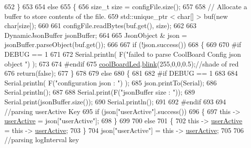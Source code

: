 \begin{DoxyCode}
652     \}
653 
654     \textcolor{keywordflow}{else}
655     \{
656         \textcolor{keywordtype}{size\_t} size = configFile.size();
657 
658         \textcolor{comment}{// Allocate a buffer to store contents of the file.}
659         std::unique\_ptr < char[] > buf(\textcolor{keyword}{new} \textcolor{keywordtype}{char}[size]);
660 
661         configFile.readBytes(buf.get(), size);
662 
663         DynamicJsonBuffer jsonBuffer;
664 
665         JsonObject & json = jsonBuffer.parseObject(buf.get());
666 
667         \textcolor{keywordflow}{if} (!json.success())
668         \{
669         
670 \textcolor{preprocessor}{        #if DEBUG == 1}
671 
672             Serial.println( F(\textcolor{stringliteral}{"failed to parse CoolBoard Config json object "}) );
673     
674 \textcolor{preprocessor}{        #endif}
675             \hyperlink{classCoolBoard_a1b1d3c684a5baa56b08486e192fd8e97}{coolBoardLed}.\hyperlink{classCoolBoardLed_a96e1ea13003eee34c9dbcef340404426}{blink}(255,0,0,0.5);\textcolor{comment}{//shade of red     }
676             \textcolor{keywordflow}{return}(\textcolor{keyword}{false});
677         \}
678 
679         \textcolor{keywordflow}{else}
680         \{   
681         
682 \textcolor{preprocessor}{        #if DEBUG == 1}
683             
684             Serial.println( F(\textcolor{stringliteral}{"configuration json : "}) );
685             json.printTo(Serial);
686             Serial.println();
687             
688             Serial.print(F(\textcolor{stringliteral}{"jsonBuffer size : "}));
689             Serial.print(jsonBuffer.size());
690             Serial.println();
691 
692 \textcolor{preprocessor}{        #endif}
693             
694             \textcolor{comment}{//parsing userActive Key}
695             \textcolor{keywordflow}{if} (json[\textcolor{stringliteral}{"userActive"}].success())
696             \{
697                 \textcolor{keyword}{this} -> \hyperlink{classCoolBoard_a6395459131d6889a3005f79c7a35e964}{userActive} = json[\textcolor{stringliteral}{"userActive"}];
698             \}
699 
700             \textcolor{keywordflow}{else}
701             \{
702                 \textcolor{keyword}{this} -> \hyperlink{classCoolBoard_a6395459131d6889a3005f79c7a35e964}{userActive} = \textcolor{keyword}{this} -> \hyperlink{classCoolBoard_a6395459131d6889a3005f79c7a35e964}{userActive};
703             \}
704             json[\textcolor{stringliteral}{"userActive"}] = \textcolor{keyword}{this} -> \hyperlink{classCoolBoard_a6395459131d6889a3005f79c7a35e964}{userActive};
705 
706             \textcolor{comment}{//parsing logInterval key}

\end{DoxyCode}
